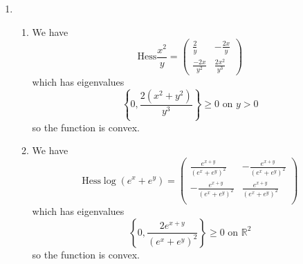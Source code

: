 \documentclass[12pt]{article}
\begin{document}
\begin{enumerate}
\begin{enumerate}
\begin{proof}
            Recall that $f\in C^2(\Omega)$ is convex in $\Omega$ iff $\text{Hess}f\geq 0$. Further, recall that a convex set is bounded by a convex curve. Then, we only need to prove that the boundary of $C$ is not a convex curve by showing $\text{Hess}f<0$.
            $$
            \text{Hess}f = 
            \begin{pmatrix}
                2 & 5 \\
                 5& 4 
                \end{pmatrix}
            $$
            has eigenvalues $\{4 + \sqrt{34}, 4 - \sqrt{34}\}$, the latter of which is negative.
        \end{proof}
        \item The set $D:=\{x\in\mathbb R^d| \sum_ix_i^2=1 \}$ is not convex.
        \begin{proof}
            This is $S^{d-1}\hookrightarrow\mathbb R^{d}$. The sphere is obviously not convex in $\mathbb R^d$. By counterexample (or triangle inequality in general), 
            \begin{align*}
                xt+(1-t)y\big\vert_{t=1/2}=\frac{x+y}{2}
            \end{align*}
            which has norm $\sqrt{2}/2$ and hence is outside $D$.

        \end{proof}
    \end{enumerate}
    \item \begin{enumerate}
        \item We have
        $$\text{Hess}\frac{x^2}{y} =  \begin{pmatrix}
            \frac{2}{y} & -\frac{2x}{y} \\
             \frac{-2x}{y^2}& \frac{2 x^2}{y^3} 
            \end{pmatrix}$$
            which has eigenvalues
            $$
            \left\{0,\frac{2(x^2+y^2)}{y^3} \right\}\geq 0\text{ on }y>0 
            $$
            so the function is convex. 
        \item We have
        $$
        \text{Hess}\log\left(e^{x}+e^{y}\right) =  
\begin{pmatrix}
         \frac{e^{x+y}}{\left(e^x+e^y\right)^2} & -\frac{e^{x+y}}{\left(e^x+e^y\right)^2} \\
         -\frac{e^{x+y}}{\left(e^x+e^y\right)^2} & \frac{e^{x+y}}{\left(e^x+e^y\right)^2} \\
\end{pmatrix}
        $$
        which has eigenvalues
            $$
            \left\{0,\frac{2 e^{x+y}}{\left(e^x+e^y\right)^2} \right\}\geq 0\text{ on }\mathbb R^2
            $$
            so the function is convex.
    \end{enumerate}
\end{enumerate}
\end{document}
